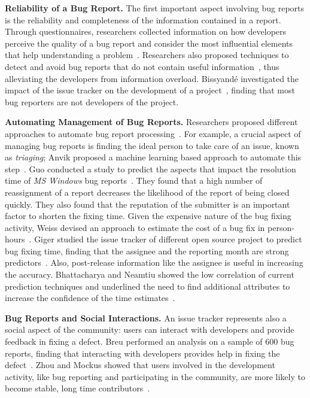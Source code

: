 \textbf{Reliability of a Bug Report.} The first important aspect involving bug reports is the reliability and completeness of the information contained in a report.
Through questionnaires, researchers collected information on how developers perceive the quality of a bug report and consider the most influential elements that help understanding a problem~\cite{Zimm2010a,Bett2007,Schr2010a}.
Researchers also proposed techniques to detect and avoid bug reports that do not contain useful information~\cite{Sun2011}, thus alleviating the developers from information overload.
Bissyand\'e \etal investigated the impact of the issue tracker on the development of a project~\cite{Biss2013}, finding that most bug reporters are not developers of the project.

\textbf{Automating Management of Bug Reports.} Researchers proposed different approaches to automate bug report processing~\cite{Weim2006}.
For example, a crucial aspect of managing bug reports is finding the ideal person to take care of an issue, known as {\em triaging}; Anvik \etal proposed a machine learning based approach to automate this step~\cite{Anvi2006a}.
Guo \etal conducted a study to predict the aspects that impact the resolution time of \textit{MS Windows} bug reports~\cite{Guo2010}.
They found that a high number of reassignment of a report decreases the likelihood of the report of being closed quickly.
They also found that the reputation of the submitter is an important factor to shorten the fixing time.
Given the expensive nature of the bug fixing activity, Weiss \etal devised an approach to estimate the cost of a bug fix in person-hours~\cite{Weis2007a}.
Giger \etal studied the issue tracker of different open source project to predict bug fixing time, finding that the assignee and the reporting month are strong predictors~\cite{Gige2010}.
Also, post-release information like the assignee is useful in increasing the accuracy.
Bhattacharya and Neamtiu showed the low correlation of current prediction techniques and underlined the need to find additional attributes to increase the confidence of the time estimates~\cite{Bhat2011}.

\textbf{Bug Reports and Social Interactions.} An issue tracker represents also a social aspect of the community: users can interact with developers and provide feedback in fixing a defect.
Breu \etal performed an analysis on a sample of 600 bug reports, finding that interacting with developers provides help in fixing the defect~\cite{Breu2010}.
Zhou and Mockus showed that users involved in the development activity, like bug reporting and participating in the community, are more likely to become stable, long time contributors~\cite{Zhou2015}.

